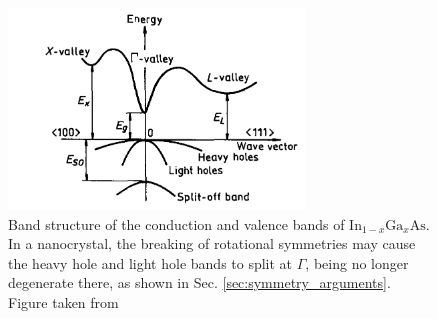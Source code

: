 \begin{figure}
\begin{center}
\includegraphics[width=0.7\textwidth]{figures/ingaas_band_structure}
\caption{Band structure of the conduction and valence bands of $\text{In}_{1-x}\text{Ga}_x\text{As}$. In a nanocrystal, the breaking of rotational symmetries may cause the heavy hole and light hole bands to split at $\Gamma$, being no longer degenerate there, as shown in Sec. \ref{sec:symmetry_arguments}. Figure taken from \cite[Fig. 3.2.1]{semiconductor_handbook} \label{fig:ingaas_band_structure}}
\end{center}
\end{figure}

